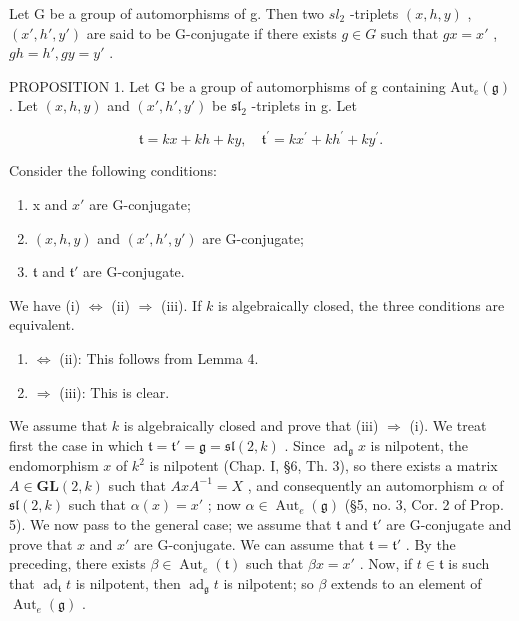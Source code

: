 Let G be a group of automorphisms of g. Then two \(sl_{2}\) -triplets \((x,h,y)\) , \((x',h',y')\) are said to be G-conjugate if there exists \(g\in G\) such that \(gx=x'\) , \(gh=h',gy=y'\) .

PROPOSITION 1. Let G be a group of automorphisms of g containing \(\mathrm{Aut}_e(\mathfrak{g})\) . Let \((x,h,y)\) and \((x',h',y')\) be \(\mathfrak{sl}_2\) -triplets in g. Let

\[
\mathfrak {t} = k x + k h + k y, \quad \mathfrak {t} ^ {\prime} = k x ^ {\prime} + k h ^ {\prime} + k y ^ {\prime}.
\]

Consider the following conditions:

\begin{enumerate}
\def\labelenumi{(\roman{enumi})}
\item
  x and \(x'\) are G-conjugate;
\item
  \((x, h, y)\) and \((x', h', y')\) are G-conjugate;
\item
  \(\mathfrak{t}\) and \(\mathfrak{t}'\) are G-conjugate.
\end{enumerate}

We have (i) \(\Longleftrightarrow\) (ii) \(\Longrightarrow\) (iii). If \(k\) is algebraically closed, the three conditions are equivalent.

\begin{enumerate}
\def\labelenumi{(\roman{enumi})}
\item
  \(\Longleftrightarrow\) (ii): This follows from Lemma 4.
\item
  \(\Longrightarrow\) (iii): This is clear.
\end{enumerate}

We assume that \(k\) is algebraically closed and prove that (iii) \(\Longrightarrow\) (i). We treat first the case in which \(\mathfrak{t} = \mathfrak{t}' = \mathfrak{g} = \mathfrak{sl}(2, k)\) . Since \(\operatorname{ad}_{\mathfrak{g}} x\) is nilpotent, the endomorphism \(x\) of \(k^2\) is nilpotent (Chap. I, §6, Th. 3), so there exists a matrix \(A \in \mathbf{GL}(2, k)\) such that \(AxA^{-1} = X\) , and consequently an automorphism \(\alpha\) of \(\mathfrak{sl}(2, k)\) such that \(\alpha(x) = x'\) ; now \(\alpha \in \operatorname{Aut}_e(\mathfrak{g})\) (§5, no. 3, Cor. 2 of Prop. 5). We now pass to the general case; we assume that \(\mathfrak{t}\) and \(\mathfrak{t}'\) are G-conjugate and prove that \(x\) and \(x'\) are G-conjugate. We can assume that \(\mathfrak{t} = \mathfrak{t}'\) . By the preceding, there exists \(\beta \in \operatorname{Aut}_e(\mathfrak{t})\) such that \(\beta x = x'\) . Now, if \(t \in \mathfrak{t}\) is such that \(\operatorname{ad}_{\mathfrak{t}} t\) is nilpotent, then \(\operatorname{ad}_{\mathfrak{g}} t\) is nilpotent; so \(\beta\) extends to an element of \(\operatorname{Aut}_e(\mathfrak{g})\) .

